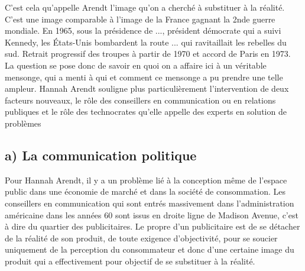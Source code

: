 \documentclass[12pt]{article}
\begin{document}
C'est cela qu'appelle Arendt l'image qu'on a cherché à substituer à la réalité. 
C'est une image comparable à l'image de la France gagnant la 2nde guerre mondiale.
En 1965, sous la présidence de ..., président démocrate qui a suivi Kennedy, les États-Unis bombardent la route ... qui ravitaillait les rebelles du sud.
Retrait progressif des troupes à partir de 1970 et accord de Paris en 1973.
La question se pose donc de savoir en quoi on a affaire ici à un véritable mensonge, qui a menti à qui et comment ce mensonge a pu prendre une telle ampleur.
Hannah Arendt souligne plus particulièrement l'intervention de deux facteurs nouveaux, le rôle des conseillers en communication ou en relations publiques et le rôle des technocrates qu'elle appelle des experts en solution de problèmes
\subsection*{a) La communication politique}
Pour Hannah Arendt, il y a un problème lié à la conception même de l'espace public dans une économie de marché et dans la société de consommation.
Les conseillers en communication qui sont entrés massivement dans l'administration américaine dans les années 60 sont issus en droite ligne de Madison Avenue, c'est à dire du quartier des publicitaires.
Le propre d'un publicitaire est de se détacher de la réalité de son produit, de toute exigence d'objectivité, pour se soucier uniquement de la perception du consommateur et donc d'une certaine image du produit qui a effectivement pour objectif de se substituer à la réalité.
\end{document}
